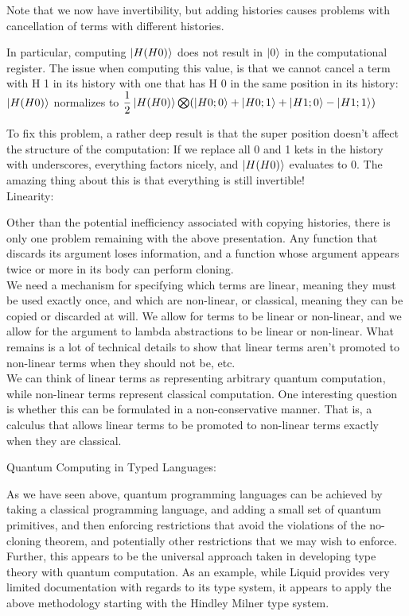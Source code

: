 \documentclass{article}
\theoremstyle{plain}
\theoremstyle{definition}
\theoremstyle{remark}
\begin{document}
Note that we now have invertibility, but adding histories causes problems with cancellation of terms with different histories.

In particular, computing  $\left|\mspace{0.5mu} H (H 0) \mspace{0.5mu}\right\rangle$ does not result in $\left|\mspace{0.5mu} 0 \mspace{0.5mu}\right\rangle$ in the computational register. The issue when computing this value, is that we cannot cancel a term with H 1 in its history with one that has H 0 in the same position in its history:
 $\left|\mspace{0.5mu} H (H 0) \mspace{0.5mu}\right\rangle$ normalizes to $\dfrac{1}{2} \left|\mspace{0.5mu} H (H 0) \mspace{0.5mu}\right\rangle \bigotimes (\left|\mspace{0.5mu} H 0; 0 \mspace{0.5mu}\right\rangle + \left|\mspace{0.5mu} H 0; 1 \mspace{0.5mu}\right\rangle + \left|\mspace{0.5mu} H 1; 0 \mspace{0.5mu}\right\rangle - \left|\mspace{0.5mu} H 1; 1 \mspace{0.5mu}\right\rangle)$

 To fix this problem, a rather deep result is that the super position doesn't affect the structure of the computation: If we replace all 0 and 1 kets in the history with underscores, everything factors nicely, and $\left|\mspace{0.5mu} H (H 0) \mspace{0.5mu}\right\rangle$ evaluates to 0. The amazing thing about this is that everything is still invertible!
$$$$
$$$$
{
\Large Linearity:}
$$$$
$$$$

Other than the potential inefficiency associated with copying histories, there is only one problem remaining with the above presentation.
Any function that discards its argument loses information, and a function whose argument appears twice or more in its body can perform cloning.
$$$$
We need a mechanism for specifying which terms are linear, meaning they must be used exactly once, and which are non-linear, or classical, meaning they can be copied or discarded at will. We allow for terms to be linear or non-linear, and we allow for the argument to lambda abstractions to be linear or non-linear. What remains is a lot of technical details to show that linear terms aren't promoted to non-linear terms when they should not be, etc.
$$$$
We can think of linear terms as representing arbitrary quantum computation, while non-linear terms represent classical computation.
One interesting question is whether this can be formulated in a non-conservative manner. That is, a calculus that allows linear terms to be promoted to non-linear terms exactly when they are classical. 
$$$$

$$$$
$$$$
{
\Large Quantum Computing in Typed Languages:}
$$$$
$$$$

As we have seen above, quantum programming languages can be achieved by taking a classical programming language,
and adding a small set of quantum primitives, and then enforcing restrictions that avoid the violations of the no-cloning theorem, and potentially other restrictions that we may wish to enforce.
$$$$
Further, this appears to be the universal approach taken in developing type theory with quantum computation.
As an example, while Liquid provides very limited documentation with regards to its type system,
it appears to apply the above methodology starting with the Hindley Milner type system.
$$$$
\end{document}
